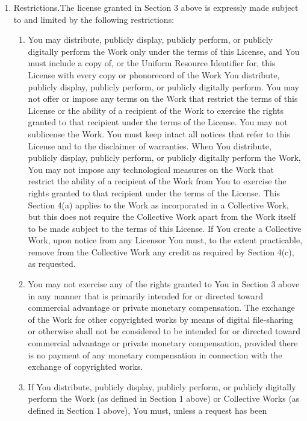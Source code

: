 \begin{enumerate}
  \item {Restrictions.The license granted in Section 3 above is expressly made
  subject to and limited by the following restrictions:}
  \begin{enumerate} 
    \item {You may distribute, publicly display, publicly perform, or publicly
    digitally perform the Work only under the terms of this License, and You
    must include a copy of, or the Uniform Resource Identifier for, this License
    with every copy or phonorecord of the Work You distribute, publicly display,
    publicly perform, or publicly digitally perform. You may not offer or impose
    any terms on the Work that restrict the terms of this License or the ability
    of a recipient of the Work to exercise the rights granted to that recipient
    under the terms of the License. You may not sublicense the Work. You must
    keep intact all notices that refer to this License and to the disclaimer of
    warranties. When You distribute, publicly display, publicly perform, or
    publicly digitally perform the Work, You may not impose any technological
    measures on the Work that restrict the ability of a recipient of the Work
    from You to exercise the rights granted to that recipient under the terms of
    the License. This Section 4(a) applies to the Work as incorporated in a
    Collective Work, but this does not require the Collective Work apart from
    the Work itself to be made subject to the terms of this License. If You
    create a Collective Work, upon notice from any Licensor You must, to the
    extent practicable, remove from the Collective Work any credit as required
    by Section 4(c), as requested.}
    \item {You may not exercise any of the rights granted to You in Section 3
    above in any manner that is primarily intended for or directed toward
    commercial advantage or private monetary compensation. The exchange of the
    Work for other copyrighted works by means of digital file-sharing or
    otherwise shall not be considered to be intended for or directed toward
    commercial advantage or private monetary compensation, provided there is no
    payment of any monetary compensation in connection with the exchange of
    copyrighted works.}
    \item {If You distribute, publicly display, publicly perform, or publicly
    digitally perform the Work (as defined in Section 1 above) or Collective
    Works (as defined in Section 1 above), You must, unless a request has been
}
\end{enumerate}
\end{enumerate}
